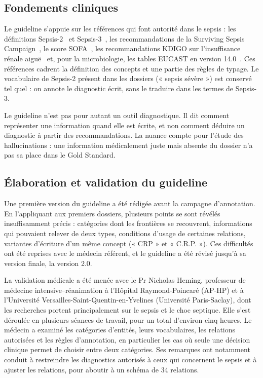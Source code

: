 \subsection{Fondements cliniques}\label{sec:c3-3-3-3}

Le guideline s’appuie sur les références qui font autorité dans le sepsis : les définitions Sepsis-2~\cite{levy2003sccm} et Sepsis-3~\cite{singer2016third}, les recommandations de la Surviving Sepsis Campaign~\cite{evans2021ssc}, le score SOFA~\cite{vincent1996sofa}, les recommandations KDIGO sur l’insuffisance rénale aiguë~\cite{kdigo2012aki} et, pour la microbiologie, les tables EUCAST en version 14.0~\cite{eucast}. Ces références cadrent la définition des concepts et une partie des règles de typage. Le vocabulaire de Sepsis-2 présent dans les dossiers (« sepsis sévère ») est conservé tel quel : on annote le diagnostic écrit, sans le traduire dans les termes de Sepsis-3.

Le guideline n’est pas pour autant un outil diagnostique. Il dit comment représenter une information quand elle est écrite, et non comment déduire un diagnostic à partir des recommandations. La nuance compte pour l’étude des hallucinations : une information médicalement juste mais absente du dossier n’a pas sa place dans le Gold Standard.

\subsection{Élaboration et validation du guideline}\label{sec:c3-3-3-4}

Une première version du guideline a été rédigée avant la campagne d’annotation. En l’appliquant aux premiers dossiers, plusieurs points se sont révélés insuffisamment précis : catégories dont les frontières se recouvrent, informations qui pouvaient relever de deux types, conditions d’usage de certaines relations, variantes d’écriture d’un même concept (« CRP » et « C.R.P. »). Ces difficultés ont été reprises avec le médecin référent, et le guideline a été révisé jusqu’à sa version finale, la version 2.0.

La validation médicale a été menée avec le Pr Nicholas Heming, professeur de médecine intensive--réanimation à l’Hôpital Raymond-Poincaré (AP-HP) et à l’Université Versailles-Saint-Quentin-en-Yvelines (Université Paris-Saclay), dont les recherches portent principalement sur le sepsis et le choc septique. Elle s’est déroulée en plusieurs séances de travail, pour un total d’environ cinq heures. Le médecin a examiné les catégories d’entités, leurs vocabulaires, les relations autorisées et les règles d’annotation, en particulier les cas où seule une décision clinique permet de choisir entre deux catégories. Ses remarques ont notamment conduit à restreindre les diagnostics autorisés à ceux qui concernent le sepsis et à ajuster les relations, pour aboutir à un schéma de 34 relations.


